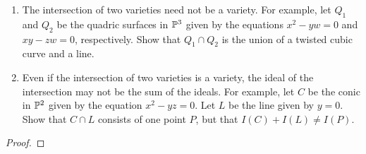 \label{1.2.16}

\begin{enumerate}[label = (\alph*)]
    \item The intersection of two varieties need not be a variety. For example, let $Q_1$ and $Q_2$ be the quadric surfaces in $\P^3$ given by the equations $x^2 - yw = 0$ and $xy - zw = 0$, respectively. Show that $Q_1 \cap Q_2$ is the union of a twisted cubic curve and a line.
    
    \item Even if the intersection of two varieties is a variety, the ideal of the intersection may not be the sum of the ideals. For example, let $C$ be the conic in $\P^2$ given by the equation $x^2 - yz = 0$. Let $L$ be the line given by $y = 0$. Show that $C \cap L$ consists of one point $P$, but that $I(C) + I(L) \neq I(P)$.
\end{enumerate}

\begin{proof}
    
\end{proof}